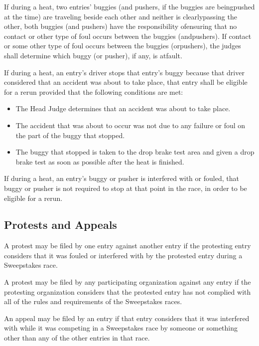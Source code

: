 	If during a heat, two entries' buggies (and pushers, if the buggies are beingpushed at the time) are traveling beside each other and neither is clearlypassing the other, both buggies (and pushers) have the responsibility ofensuring that no contact or other type of foul occurs between the buggies (andpushers). If contact or some other type of foul occurs between the buggies (orpushers), the judges shall determine which buggy (or pusher), if any, is atfault.

	If during a heat, an entry's driver stops that entry's buggy because that driver considered that an accident was about to take place, that entry shall be eligible for a rerun provided that the following conditions are met:

		\begin{itemize}

			\item The Head Judge determines that an accident was about to take place.

			\item The accident that was about to occur was not due to any failure or foul on the part of the buggy that stopped.

			\item The buggy that stopped is taken to the drop brake test area and given a drop brake test as soon as possible after the heat is finished.

		\end{itemize}

	If during a heat, an entry's buggy or pusher is interfered with or fouled, that buggy or pusher is not required to stop at that point in the race, in order to be eligible for a rerun.

\subsection{Protests and Appeals}

	A protest may be filed by one entry against another entry if the protesting entry considers that it was fouled or interfered with by the protested entry during a Sweepstakes race.

	A protest may be filed by any participating organization against any entry if the protesting organization considers that the protested entry has not complied with all of the rules and requirements of the Sweepstakes races.

	An appeal may be filed by an entry if that entry considers that it was interfered with while it was competing in a Sweepstakes race by someone or something other than any of the other entries in that race.

